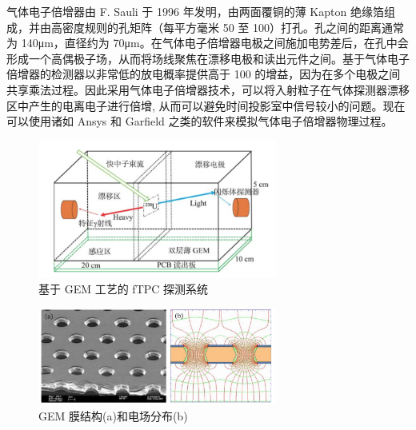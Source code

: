 \documentclass[AutoFakeBold]{LZUThesis}
\begin{document}
气体电子倍增器\cite{fenker2008bonus, sauli2016gas}由 F. Sauli 于 1996 年发明，由两面覆铜的薄 Kapton 绝缘箔组成，并由高密度规则的孔矩阵（每平方毫米 50 至 100）打孔。孔之间的距离通常为 140μm，直径约为 70μm。在气体电子倍增器电极之间施加电势差后，在孔中会形成一个高偶极子场，从而将场线聚焦在漂移电极和读出元件之间。基于气体电子倍增器的检测器以非常低的放电概率提供高于 100 的增益，因为在多个电极之间共享乘法过程。因此采用气体电子倍增器技术，可以将入射粒子在气体探测器漂移区中产生的电离电子进行倍增, 从而可以避免时间投影室中信号较小的问题。现在可以使用诸如 Ansys 和 Garfield 之类的软件来模拟气体电子倍增器物理过程。

\begin{figure}[H]
    \centering
    \includegraphics[width=0.7\textwidth]{figures/GEM-TPC.png}
    \caption{基于 GEM 工艺的 fTPC 探测系统\cite{魏康2019基于GEM工艺的裂变时间投影室中裂变碎片的讨论}}
    \label{fig_GEM-TPC}
\end{figure}

\begin{figure}[H]
    \centering
    \includegraphics[width=0.7\textwidth]{figures/GEM.png}
    \caption{GEM 膜结构(a)和电场分布(b)}
    \label{fig_GEM}
\end{figure}
\end{document}
